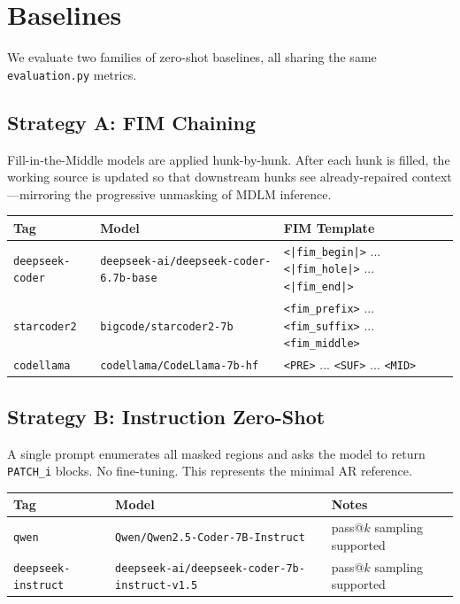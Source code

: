 \documentclass[11pt,a4paper]{article}
\begin{document}
\section{Baselines}
\label{sec:baselines}

We evaluate two families of zero-shot baselines, all sharing the same \texttt{evaluation.py} metrics.

\subsection{Strategy A: FIM Chaining}

Fill-in-the-Middle models are applied hunk-by-hunk. After each hunk is filled, the working source is updated so that downstream hunks see already-repaired context—mirroring the progressive unmasking of MDLM inference.

\begin{center}
\begin{tabular}{lll}
\toprule
\textbf{Tag} & \textbf{Model} & \textbf{FIM Template} \\
\midrule
\texttt{deepseek-coder} & \texttt{deepseek-ai/deepseek-coder-6.7b-base} & \texttt{<|fim\_begin|>} ... \texttt{<|fim\_hole|>} ... \texttt{<|fim\_end|>} \\
\texttt{starcoder2}     & \texttt{bigcode/starcoder2-7b}              & \texttt{<fim\_prefix>} ... \texttt{<fim\_suffix>} ... \texttt{<fim\_middle>} \\
\texttt{codellama}      & \texttt{codellama/CodeLlama-7b-hf}          & \texttt{<PRE>} ... \texttt{<SUF>} ... \texttt{<MID>} \\
\bottomrule
\end{tabular}
\end{center}

\subsection{Strategy B: Instruction Zero-Shot}

A single prompt enumerates all masked regions and asks the model to return \texttt{PATCH\_i} blocks. No fine-tuning. This represents the minimal AR reference.

\begin{center}
\begin{tabular}{lll}
\toprule
\textbf{Tag} & \textbf{Model} & \textbf{Notes} \\
\midrule
\texttt{qwen} & \texttt{Qwen/Qwen2.5-Coder-7B-Instruct} & pass@\(k\) sampling supported \\
\texttt{deepseek-instruct} & \texttt{deepseek-ai/deepseek-coder-7b-instruct-v1.5} & pass@\(k\) sampling supported \\
\bottomrule
\end{tabular}
\end{center}
\end{document}
